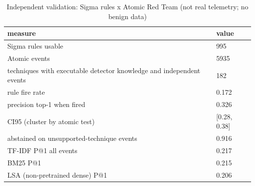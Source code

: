 \begin{table}[t]\centering\caption{Independent validation: Sigma rules x Atomic Red Team (not real telemetry; no benign data)}
\begin{tabular}{ll}\hline
measure & value \\\hline
Sigma rules usable & 995 \\
Atomic events & 5935 \\
techniques with executable detector knowledge and independent events & 182 \\
rule fire rate & 0.172 \\
precision top-1 when fired & 0.326 \\
CI95 (cluster by atomic test) & [0.28, 0.38] \\
abstained on unsupported-technique events & 0.916 \\
TF-IDF P@1 all events & 0.217 \\
BM25 P@1 & 0.215 \\
LSA (non-pretrained dense) P@1 & 0.206 \\
\hline\end{tabular}\end{table}
